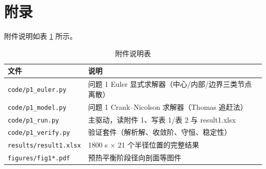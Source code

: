 \documentclass[12pt,a4paper]{ctexart}
\begin{document}
\appendix
\section{附录}
附件说明如表 \ref{tab:appendix} 所示。

\begin{table}[H]
\centering
\caption{附件说明表}
\label{tab:appendix}
\begin{tabular}{ll}
\toprule
文件 & 说明 \\
\midrule
\texttt{code/p1\_euler.py} & 问题 1 Euler 显式求解器（中心/内部/边界三类节点离散） \\
\texttt{code/p1\_model.py} & 问题 1 Crank--Nicolson 求解器（Thomas 追赶法） \\
\texttt{code/p1\_run.py} & 主驱动，读附件 1、写表 1/表 2 与 result1.xlsx \\
\texttt{code/p1\_verify.py} & 验证套件（解析解、收敛阶、守恒、稳定性） \\
\texttt{results/result1.xlsx} & 1800 s $\times$ 21 个半径位置的完整结果 \\
\texttt{figures/fig1*.pdf} & 预热平衡阶段径向剖面等图件 \\
\bottomrule
\end{tabular}
\end{table}
\end{document}
